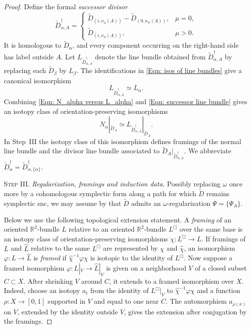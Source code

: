 \documentclass[11pt]{amsart}
\numberwithin{equation}{section}
\theoremstyle{plain}
\theoremstyle{definition}
\newcommand{\RR}{\mathbb{R}}
\begin{document}
\begin{proof}
Define the formal \emph{successor divisor}
\begin{equation}
\label{Eqn: Dagger divisors}
\widetilde D^\dagger_{\alpha,A}
=
\begin{cases}
\widetilde D_{(i,\nu_\alpha(A))}
-\widetilde D_{(0,\kappa_\alpha(A))},&\mu=0,\\[2mm]
\widetilde D_{(i,\nu_\alpha(A))},&\mu>0.
\end{cases}
\end{equation}
It is homologous to $\widetilde D_\alpha$, and every component occurring on the
right-hand side has label outside $A$. Let $L_{\widetilde D^\dagger_{\alpha,A}}$
denote the line bundle obtained from $\widetilde D^\dagger_{\alpha,A}$ by
replacing each $\widetilde D_\beta$ by $L_\beta$. The identifications in
\eqref{Eqn: isos of line bundles} give a canonical isomorphism
\begin{equation}
\label{Eqn: successor line bundle}
L_{\widetilde D^\dagger_{\alpha,A}}\simeq L_\alpha.
\end{equation}
Combining \eqref{Eqn: N_alpha versus L_alpha} and
\eqref{Eqn: successor line bundle} gives an isotopy class of
orientation-preserving isomorphisms
\begin{equation}
\label{Eqn: smooth iso of line bundles}
N_\alpha|_{\widetilde D_A}
\simeq
L_{\widetilde D^\dagger_{\alpha,A}}|_{\widetilde D_A}.
\end{equation}
In Step~III the isotopy class of this isomorphism defines framings of the normal
line bundle and the divisor line bundle associated to $\widetilde
D_A|_{\widetilde D^\dagger_{\alpha,A}}$. We abbreviate $\widetilde
D^\dagger_\alpha =\widetilde D^\dagger_{\alpha,\{\alpha\}}$.

\medskip
\noindent\textsc{Step III}. \emph{Regularization, framings and induction data.}
Possibly replacing $\omega$ once more by a cohomologous symplectic form along
a path for which $\widetilde D$ remains symplectic snc, we may assume by
\cite[Thm.\,2.13]{TMZ1} that $\widetilde D$ admits an
$\omega$-regularization $\Psi=\{\Psi_A\}$.

Below we use the following topological extension statement. A \emph{framing} of
an oriented $\RR^2$-bundle $L$ relative to an oriented $\RR^2$-bundle $L^\Box$
over the same base is an isotopy class of orientation-preserving isomorphisms
$\chi:L^\Box\to L$. If framings of $L$ and $\widehat L$ relative to the same
$L^\Box$ are represented by $\chi$ and $\widehat\chi$, an isomorphism
$\varphi:L\to\widehat L$ is \emph{framed} if $\widehat\chi^{-1}\varphi\chi$ is
isotopic to the identity of $L^\Box$. Now suppose a framed isomorphism
$\varphi:L|_V\to\widehat L|_V$ is given on a neighborhood $V$ of a closed subset
$C\subset X$. After shrinking $V$ around $C$, it extends to a framed isomorphism
over $X$. Indeed, choose an isotopy $a_t$ from the identity of $L^\Box|_V$ to
$\widehat\chi^{-1}\varphi\chi$ and a function $\rho:X\to[0,1]$ supported in $V$
and equal to one near $C$. The automorphism $a_{\rho(x)}$ on $V$, extended by
the identity outside $V$, gives the extension after conjugation by the framings.


\end{proof}
\end{document}

